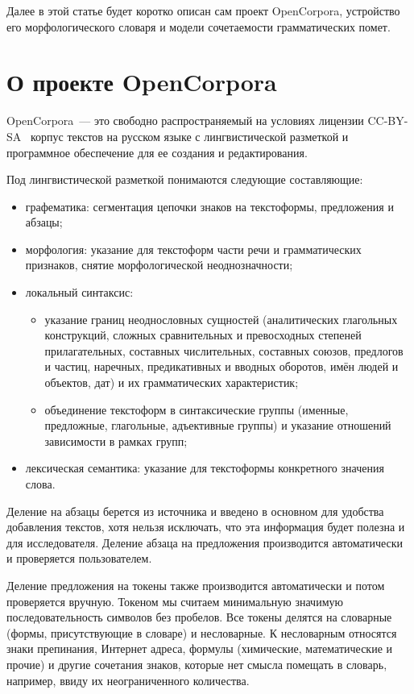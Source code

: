 \documentclass[a4paper]{article}
\begin{document}
Далее в этой статье будет коротко описан сам проект OpenCorpora, устройство его морфологического словаря и модели сочетаемости грамматических помет.
\section{О проекте OpenCorpora}
OpenCorpora~--- это свободно распространяемый на условиях лицензии CC-BY-SA~\cite{cc-by-sa} корпус текстов на русском языке с лингвистической разметкой и программное обеспечение для ее создания и редактирования.

Под лингвистической разметкой понимаются следующие составляющие:
\begin{itemize}
\item графематика: сегментация цепочки знаков на текстоформы, предложения и абзацы;
\item морфология: указание для текстоформ части речи и грамматических признаков, снятие морфологической неоднозначности;
\item локальный синтаксис:
\begin{itemize}
\item указание границ неоднословных сущностей (аналитических глагольных конструкций, сложных сравнительных и превосходных степеней прилагательных, составных числительных, составных союзов, предлогов и частиц, наречных, предикативных и вводных оборотов, имён людей и объектов, дат) и их грамматических характеристик;
\item объединение текстоформ в синтаксические группы (именные, предложные, глагольные, адъективные группы) и указание отношений зависимости в рамках групп;
\end{itemize}
\item лексическая семантика: указание для текстоформы конкретного значения слова.
\end{itemize}

Деление на абзацы берется из источника и введено в основном для удобства добавления текстов, хотя нельзя исключать, что эта информация будет полезна и для исследователя. Деление абзаца на предложения производится автоматически и проверяется пользователем.

Деление предложения на токены также производится автоматически и потом проверяется вручную. Токеном мы считаем минимальную значимую последовательность символов без пробелов. Все токены делятся на словарные (формы, присутствующие в словаре) и несловарные. К несловарным относятся знаки препинания, Интернет адреса, формулы (химические, математические и прочие) и другие сочетания знаков, которые нет смысла помещать в словарь, например, ввиду их неограниченного количества.
\end{document}
